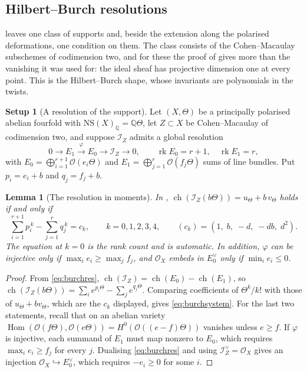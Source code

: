 \documentclass[11pt,reqno]{amsart}
\theoremstyle{plain}
\newtheorem{lemma}[theorem]{Lemma}
\theoremstyle{definition}
\newtheorem{setupenv}[theorem]{Setup}
\theoremstyle{remark}
\newcommand{\QQ}{\mathbb{Q}}
\newcommand{\cO}{\mathcal{O}}
\newcommand{\cI}{\mathcal{I}}
\newcommand{\NS}{\mathrm{NS}}
\DeclareMathOperator{\ch}{ch}
\DeclareMathOperator{\rk}{rk}
\DeclareMathOperator{\Hom}{Hom}
\begin{document}
\subsection{Hilbert--Burch resolutions}
\label{ssec:hilbertburch}

 leaves one class of supports and, beside the
extension along the polarised deformations, one condition on them.
The class consists of the Cohen--Macaulay subschemes of codimension two, and
for these the proof of  gives more than the vanishing
it was used for: the ideal sheaf has projective dimension one at every point.
This is the Hilbert--Burch shape, whose invariants are polynomials in the twists.

\begin{setupenv}[A resolution of the support]\label{setup:burch}
Let $(X,\Theta)$ be a principally polarised abelian fourfold with
$\NS(X)_{\QQ}=\QQ\Theta$, let $Z\subset X$ be Cohen--Macaulay of codimension
two, and suppose $\cI_{Z}$ admits a global resolution
\begin{equation}\label{eq:burchres}
  0\longrightarrow E_{1}\stackrel{\varphi}{\longrightarrow}E_{0}
  \longrightarrow\cI_{Z}\longrightarrow0,
  \qquad \rk E_{0}=r+1,\quad\rk E_{1}=r,
\end{equation}
with $E_{0}=\bigoplus_{i=1}^{r+1}\cO(e_{i}\Theta)$ and
$E_{1}=\bigoplus_{j=1}^{r}\cO(f_{j}\Theta)$ sums of line bundles. Put
$p_{i}=e_{i}+b$ and $q_{j}=f_{j}+b$.
\end{setupenv}

\begin{lemma}[The resolution in moments]\label{lem:burchmoments}
In , $\ch(\cI_{Z}(b\Theta))=u_{\Theta}+b\,v_{\Theta}$ holds
if and only if
\begin{equation}\label{eq:burchsystem}
  \sum_{i=1}^{r+1}p_{i}^{\,k}-\sum_{j=1}^{r}q_{j}^{\,k}=c_{k},
  \qquad k=0,1,2,3,4,
  \qquad (c_{k})=(1,\;b,\;-d,\;-db,\;d^{2}).
\end{equation}
The equation at $k=0$ is the rank count and is automatic. In addition,
$\varphi$ can be injective only if $\max_{i}e_{i}\ge\max_{j}f_{j}$, and
$\cO_{X}$ embeds in $E_{0}^{\vee}$ only if $\min_{i}e_{i}\le0$.
\end{lemma}

\begin{proof}
From \eqref{eq:burchres}, $\ch(\cI_{Z})=\ch(E_{0})-\ch(E_{1})$, so
$\ch(\cI_{Z}(b\Theta))=\sum_{i}e^{p_{i}\Theta}-\sum_{j}e^{q_{j}\Theta}$.
Comparing coefficients of $\Theta^{k}/k!$ with those of
$u_{\Theta}+bv_{\Theta}$, which are the $c_{k}$ displayed, gives
\eqref{eq:burchsystem}. For the last two statements, recall that on an
abelian variety $\Hom(\cO(f\Theta),\cO(e\Theta))=H^{0}(\cO((e-f)\Theta))$
vanishes unless $e\ge f$. If $\varphi$ is injective, each summand of $E_{1}$
must map nonzero to $E_{0}$, which requires $\max_{i}e_{i}\ge f_{j}$ for
every $j$. Dualising \eqref{eq:burchres} and using $\cI_{Z}^{\vee}=\cO_{X}$
gives an injection $\cO_{X}\hookrightarrow E_{0}^{\vee}$, which requires
$-e_{i}\ge0$ for some $i$.
\end{proof}
\end{document}
